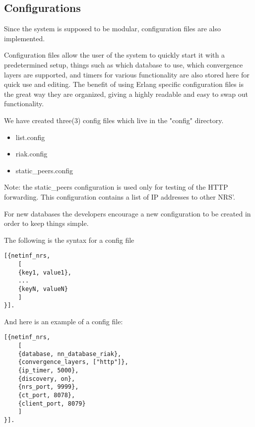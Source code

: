 \subsection {Configurations}
\label{backconfig}
Since the system is supposed to be modular, configuration files are also implemented. 

Configuration files allow the user of the system to quickly start it with a predetermined setup, things such as which database to use, which convergence layers are supported, and timers for various functionality are also stored here for quick use and editing. The benefit of using Erlang specific configuration files is the great way they are organized, giving a highly readable and easy to swap out functionality. 

We have created three(3) config files which live in the "config" directory.

\begin {itemize}
\item list.config
\item riak.config
\item static\_peers.config
\end {itemize}

Note: the static\_peers configuration is used only for testing of the HTTP forwarding. This configuration contains a list of IP addresses to other NRS'.

For new databases the developers encourage a new configuration to be created in order to keep things simple.

The following is the syntax for a config file 

\begin {verbatim}
[{netinf_nrs,
	[
	{key1, value1},
	...
	{keyN, valueN}
	]
}].

\end{verbatim}
And here is an example of a config file:
\begin {verbatim}
[{netinf_nrs,
	[
	{database, nn_database_riak},
	{convergence_layers, ["http"]},
	{ip_timer, 5000},
	{discovery, on},
	{nrs_port, 9999},
	{ct_port, 8078},
	{client_port, 8079}
	]
}].

\end{verbatim}


